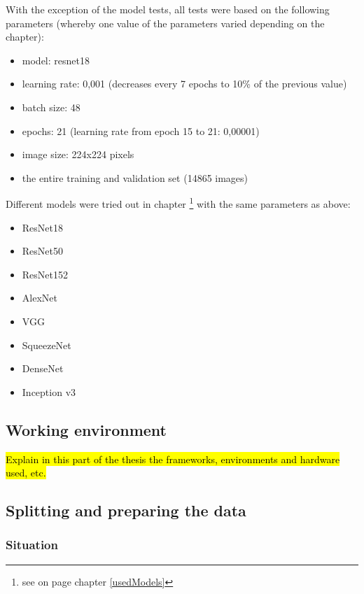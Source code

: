 \documentclass[10pt]{article}
\begin{document}
			With the exception of the model tests, all tests were based on the following parameters
			(whereby one value of the parameters varied depending on the chapter):
		
			\begin{itemize}
				\item model: resnet18
				\item learning rate: 0,001 (decreases every 7 epochs to 10\% of the previous value)
				\item batch size: 48
				\item epochs: 21 (learning rate from epoch 15 to 21: 0,00001)
				\item image size: 224x224 pixels
				\item the entire training and validation set (14865 images)
			\end{itemize}
		
			Different models were tried out in chapter \flqq{}\footnote{
				see on page \pageref{usedModels}
				chapter \ref{usedModels}
				\flqq{}\frqq
			}\frqq{} with the same
			parameters as above:
		
			\begin{itemize}
				\item ResNet18
				\item ResNet50
				\item ResNet152
				\item AlexNet
				\item VGG
				\item SqueezeNet
				\item DenseNet
				\item Inception v3
			\end{itemize}
			
		\subsection{Working environment}
	
			\hl{Explain in this part of the thesis the frameworks, environments and hardware used, etc.}
			
		\subsection{Splitting and preparing the data}
		
			\subsubsection{Situation}
			
\end{document}
